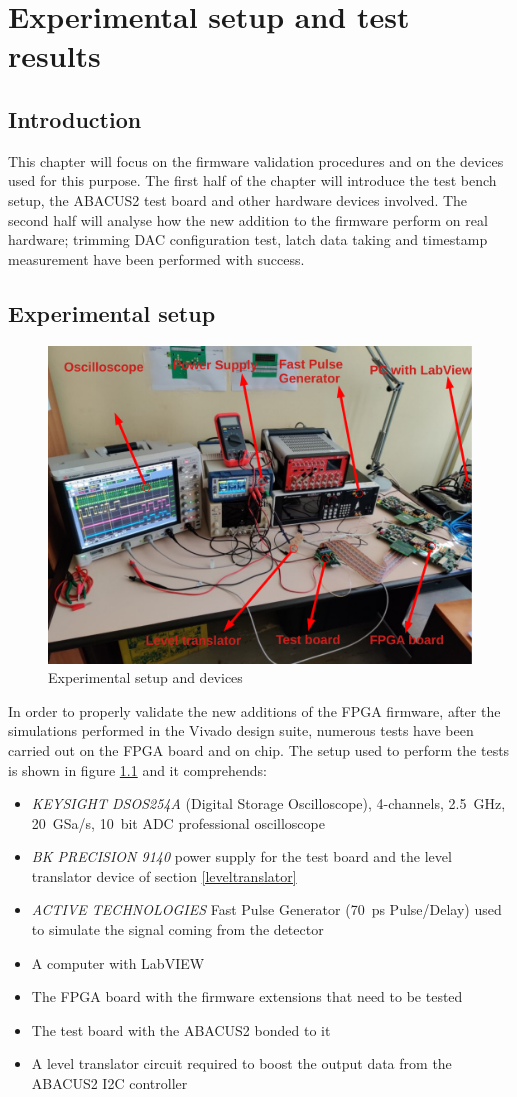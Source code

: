 \chapter{Experimental setup and test results}
\section{Introduction}
This chapter will focus on the firmware validation procedures and on the devices used for this purpose. The first half of the chapter will introduce the test bench setup, the ABACUS2 test board and other hardware devices involved. The second half will analyse how the new addition to the firmware perform on real hardware; trimming DAC configuration test, latch data taking and timestamp measurement have been performed with success.

\section{Experimental setup}\label{testbench}
\begin{figure}[H]
	\centering
	\includegraphics[width=0.7\linewidth]{IMG/ch5/TESTBENCH}
	\caption{Experimental setup and devices}
	\label{fig:testbench}
\end{figure}
In order to properly validate the new additions of the FPGA firmware, after the simulations performed in the Vivado design suite, numerous tests have been carried out on the FPGA board and on chip.
The setup used to perform the tests is shown in figure \ref{fig:testbench} and it comprehends:
\begin{itemize}
	\item \textit{KEYSIGHT DSOS254A} (Digital Storage Oscilloscope), 4-channels, 2.5~GHz, 20~GSa/s, 10~bit ADC professional oscilloscope
	\item \textit{BK PRECISION 9140} power supply for the test board and the level translator device of section \ref{leveltranslator}
	\item \textit{ACTIVE TECHNOLOGIES} Fast Pulse Generator (70~ps Pulse/Delay) used to simulate the signal coming from the detector
	\item A computer with LabVIEW 
	\item The FPGA board with the firmware extensions that need to be tested
	\item The test board with the ABACUS2 bonded to it
	\item A level translator circuit required to boost the output data from the ABACUS2 I2C controller
\end{itemize}

